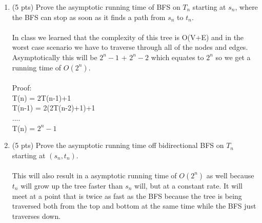 \documentclass[12pt]{article}
\begin{document}
\begin{enumerate}
\begin{enumerate}
	\begin{enumerate}
	\item (5 pts) Prove the asymptotic running time of BFS on $T_n$ starting at $s_n$, where the BFS can stop as soon as it finds a path from $s_n$ to $t_n$.
	\\
	\\
	In class we learned that the complexity of this tree is O(V+E) and in the worst case scenario we have to traverse through all of the nodes and edges. Asymptotically this will be $2^{n} - 1$ + $2^{n} - 2$ which equates to $2^{n}$ so we get a running time of $O(2^{n})$.
	\\
	\\
	Proof:\\
	T(n) = 2T(n-1)+1 \\
	T(n-1) = 2(2T(n-2)+1)+1\\
	....\\
	T(n) = $2^{n} - 1$
	\pagebreak

	\item (5 pts) Prove the asymptotic running time off bidirectional BFS on $T_n$ starting at $(s_n, t_n)$.
	\\
	\\
	This will also result in a asymptotic running time of $O(2^{n})$ as well because $t_n$ will grow up the tree faster than $s_n$ will, but at a constant rate. It will meet at a point that is twice as fast as the BFS because the tree is being traversed both from the top and bottom at the same time while the BFS just traverses down.
	\pagebreak
	
	\end{enumerate}		
	\end{enumerate}
	


\end{enumerate}
\end{document}

